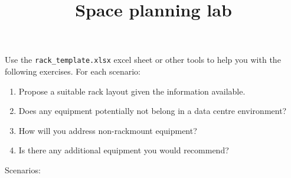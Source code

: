 \documentclass{pgnotes}
\title{Space planning lab}
\begin{document}
\maketitle

Use the \texttt{rack\_template.xlsx} excel sheet or other tools to help you with the following exercises.
For each scenario:
\begin{enumerate}\tightlist
\item Propose a suitable rack layout given the information available.
\item Does any equipment potentially not belong in a data centre environment?
\item How will you address non-rackmount equipment? 
\item Is there any additional equipment you would recommend? 
\end{enumerate}
Scenarios:
\end{document}
